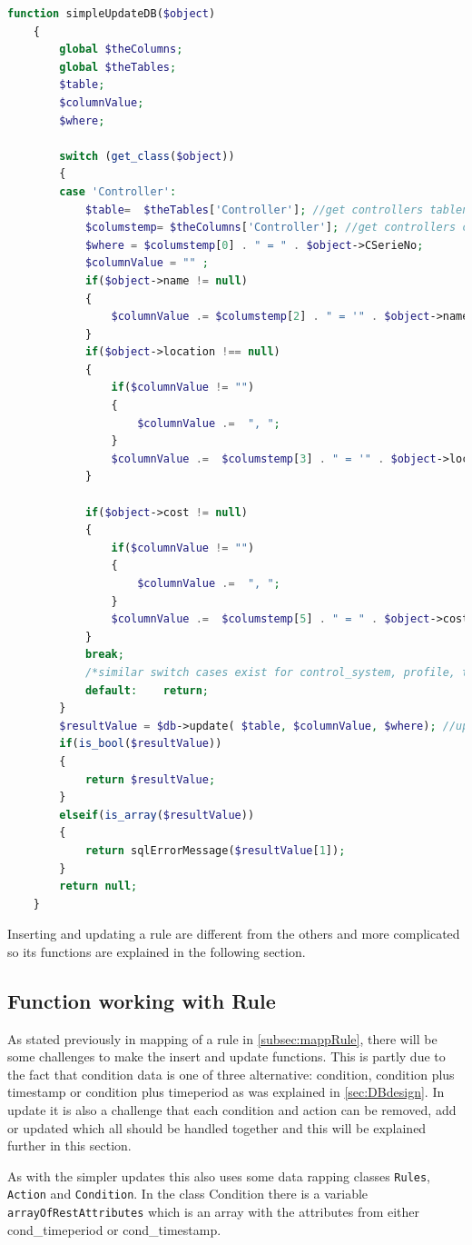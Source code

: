 \begin{lstlisting}[language=PHP, label=code:simpleUpdate, caption=simpleUpdateDB code sample]
function simpleUpdateDB($object)
	{
		global $theColumns;
		global $theTables;
		$table;
		$columnValue;
		$where;

		switch (get_class($object))
		{ 		
		case 'Controller':
			$table=  $theTables['Controller']; //get controllers tablename
			$columstemp= $theColumns['Controller']; //get controllers columns in array
			$where = $columstemp[0] . " = " . $object->CSerieNo;
			$columnValue = "" ;
			if($object->name != null)
			{
				$columnValue .= $columstemp[2] . " = '" . $object->name . "'";
			}
			if($object->location !== null) 
			{
				if($columnValue != "")
				{
					$columnValue .=  ", ";
				}
				$columnValue .=  $columstemp[3] . " = '" . $object->location . "'";
			}
			
			if($object->cost != null)
			{
				if($columnValue != "")
				{
					$columnValue .=  ", ";
				}
				$columnValue .=  $columstemp[5] . " = " . $object->cost;
			}
			break;
			/*similar switch cases exist for control_system, profile, tag, controller or chore*/
			default: 	return;
		}
		$resultValue = $db->update( $table, $columnValue, $where); //update the 
		if(is_bool($resultValue))
		{ 
			return $resultValue;
		}
		elseif(is_array($resultValue))
		{
			return sqlErrorMessage($resultValue[1]);
		}
		return null;
	}	
\end{lstlisting}

Inserting and updating a rule are different from the others and more complicated so its functions are explained in the following section. 

\subsection{Function working with Rule}
\label{subsec:dbRule}


As stated previously in mapping of a rule in \vref{subsec:mappRule}, there will be some challenges to make the insert and update functions. This is partly due to the fact that condition data is one of three alternative: condition, condition plus timestamp or condition plus timeperiod as was explained in \vref{sec:DBdesign}.
In update it is also a challenge that each condition and action can be removed, add or updated which all should be handled together and this will be explained further in this section. 

As with the simpler updates this also uses some data rapping classes \texttt{Rules}, \texttt{Action} and \texttt{Condition}. In the class Condition there is a variable \texttt{arrayOfRestAttributes} which is an array with the attributes from either cond\_timeperiod or cond\_timestamp.

